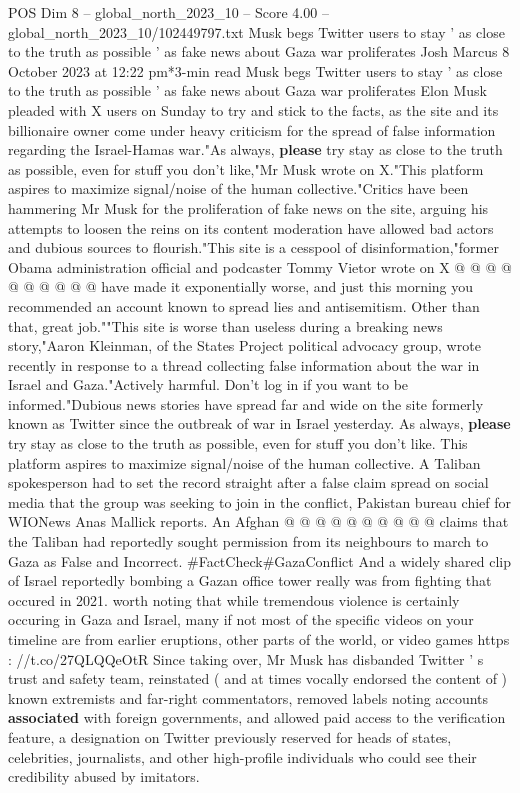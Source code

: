 \begin{textsample}{POS Dim 8 – global\_north\_2023\_10 – Score 4.00 – global\_north\_2023\_10/102449797.txt}  \label{ex:f8_pos_202}
Musk begs Twitter users to stay ' as close to the truth as possible ' as fake news about Gaza war proliferates Josh Marcus 8 October 2023 at 12:22 pm*3-min read Musk begs Twitter users to stay ' as close to the truth as possible ' as fake news about Gaza war proliferates Elon Musk pleaded with X users on Sunday to try and stick to the facts, as the site and its billionaire owner come under heavy criticism for the spread of false information regarding the Israel-Hamas war."As always, \textbf{please} try stay as close to the truth as possible, even for stuff you don't like,"Mr Musk wrote on X."This platform aspires to maximize signal/noise of the human collective."Critics have been hammering Mr Musk for the proliferation of fake news on the site, arguing his attempts to loosen the reins on its content moderation have allowed bad actors and dubious sources to flourish."This site is a cesspool of disinformation,"former Obama administration official and podcaster Tommy Vietor wrote on X @ @ @ @ @ @ @ @ @ @ have made it exponentially worse, and just this morning you recommended an account known to spread lies and antisemitism.
Other than that, great job.""This site is worse than useless during a breaking news story,"Aaron Kleinman, of the States Project political advocacy group, wrote recently in response to a thread collecting false information about the war in Israel and Gaza."Actively harmful.
Don't log in if you want to be informed."Dubious news stories have spread far and wide on the site formerly known as Twitter since the outbreak of war in Israel yesterday.
As always, \textbf{please} try stay as close to the truth as possible, even for stuff you don't like.
This platform aspires to maximize signal/noise of the human collective.
A Taliban spokesperson had to set the record straight after a false claim spread on social media that the group was seeking to join in the conflict, Pakistan bureau chief for WIONews Anas Mallick reports.
An Afghan @ @ @ @ @ @ @ @ @ @ claims that the Taliban had reportedly sought permission from its neighbours to march to Gaza as False and Incorrect. \#FactCheck\#GazaConflict And a widely shared clip of Israel reportedly bombing a Gazan office tower really was from fighting that occured in 2021. worth noting that while tremendous violence is certainly occuring in Gaza and Israel, many if not most of the specific videos on your timeline are from earlier eruptions, other parts of the world, or video games https : //t.co/27QLQQeOtR Since taking over, Mr Musk has disbanded Twitter ' s trust and safety team, reinstated ( and at times vocally endorsed the content of ) known extremists and far-right commentators, removed labels noting accounts \textbf{associated} with foreign governments, and allowed paid access to the verification feature, a designation on Twitter previously reserved for heads of states, celebrities, journalists, and other high-profile individuals who could see their credibility abused by imitators.

\end{textsample}
